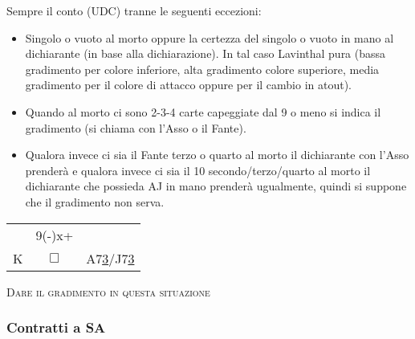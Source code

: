 \documentclass[a4paper,italian]{article}
\newcommand{\cards}[1]{\textsf{#1}}
\newcommand\onesuitenw[3]%
    {%
        \begin{center}%
            \begin{tabular}{>{\hfill}p{3cm}cp{3cm}}%
                & \cards{#2} \\%
                \cards{#1}& $\Box$    & \cards{#3}%
            \end{tabular}%
        \end{center}%
        }
\begin{document}
                                Sempre il conto (UDC) tranne le seguenti eccezioni:
                                \begin{itemize}
                                    \item Singolo o vuoto al morto oppure la certezza del singolo o vuoto in mano al dichiarante
                                        (in base alla dichiarazione). In tal caso Lavinthal pura (bassa gradimento per colore
                                        inferiore, alta gradimento colore superiore, media gradimento per il colore di attacco
                                        oppure per il cambio in atout).
                                    \item Quando al morto ci sono 2-3-4 carte capeggiate dal 9 o meno si indica il gradimento (si
                                        chiama con l’Asso o il Fante).
                                    \item Qualora invece ci sia il Fante terzo o quarto al morto il
                                        dichiarante con l’Asso prenderà e qualora invece ci sia il 10 secondo/terzo/quarto al
                                        morto il dichiarante che possieda AJ in mano prenderà ugualmente, quindi si suppone
                                        che il gradimento non serva.
                                \end{itemize}
                                \onesuitenw{K}{9(-)x+}{A7\underline{3}/J7\underline{3}}
                                \begin{center}
                                    \textsc{Dare il gradimento in questa situazione}
                                \end{center}
                                \subsubsection{Contratti a SA}
\end{document}
